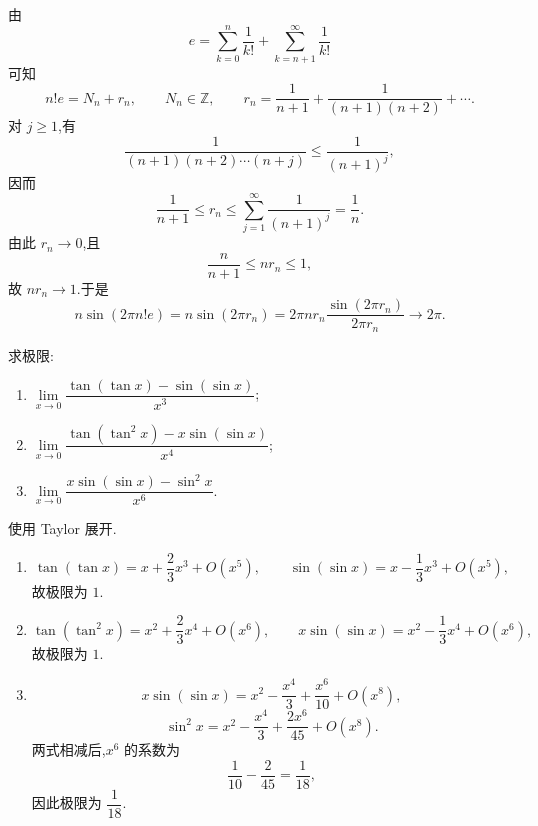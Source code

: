 \begin{solution}
    由
    \[
        e=\sum\limits_{k=0}^{n}\dfrac{1}{k!}
        +\sum\limits_{k=n+1}^{\infty}\dfrac{1}{k!}
    \]
    可知
    \[
        n!e=N_n+r_n,
        \qquad
        N_n\in\mathbb{Z},
        \qquad
        r_n=\dfrac{1}{n+1}+\dfrac{1}{(n+1)(n+2)}+\cdots.
    \]
    对 $j\geq1$,有
    \[
        \dfrac{1}{(n+1)(n+2)\cdots(n+j)}
        \leq\dfrac{1}{(n+1)^j},
    \]
    因而
    \[
        \dfrac{1}{n+1}\leq r_n
        \leq\sum\limits_{j=1}^{\infty}\dfrac{1}{(n+1)^j}
        =\dfrac{1}{n}.
    \]
    由此 $r_n\to0$,且
    \[
        \dfrac{n}{n+1}\leq nr_n\leq1,
    \]
    故 $nr_n\to1$.于是
    \[
        n\sin(2\pi n!e)
        =n\sin(2\pi r_n)
        =2\pi nr_n\dfrac{\sin(2\pi r_n)}{2\pi r_n}
        \longrightarrow2\pi.
    \]
\end{solution}

\begin{example}
    求极限:
    \begin{enumerate}
        \item $\displaystyle
                  \lim\limits_{x\to0}
                  \dfrac{\tan(\tan x)-\sin(\sin x)}{x^3}$;
        \item $\displaystyle
                  \lim\limits_{x\to0}
                  \dfrac{\tan(\tan^2x)-x\sin(\sin x)}{x^4}$;
        \item $\displaystyle
                  \lim\limits_{x\to0}
                  \dfrac{x\sin(\sin x)-\sin^2x}{x^6}$.
    \end{enumerate}
\end{example}
\exampleblank

\begin{solution}
    使用 Taylor 展开.
    \begin{enumerate}
        \item
              \[
                  \tan(\tan x)=x+\dfrac{2}{3}x^3+O(x^5),
                  \qquad
                  \sin(\sin x)=x-\dfrac{1}{3}x^3+O(x^5),
              \]
              故极限为 $1$.
        \item
              \[
                  \tan(\tan^2x)=x^2+\dfrac{2}{3}x^4+O(x^6),
                  \qquad
                  x\sin(\sin x)=x^2-\dfrac{1}{3}x^4+O(x^6),
              \]
              故极限为 $1$.
        \item
              \[
                  x\sin(\sin x)=x^2-\dfrac{x^4}{3}+\dfrac{x^6}{10}+O(x^8),
              \]
              \[
                  \sin^2x=x^2-\dfrac{x^4}{3}+\dfrac{2x^6}{45}+O(x^8).
              \]
              两式相减后,$x^6$ 的系数为
              \[
                  \dfrac{1}{10}-\dfrac{2}{45}=\dfrac{1}{18},
              \]
              因此极限为 $\dfrac{1}{18}$.
    \end{enumerate}
\end{solution}



